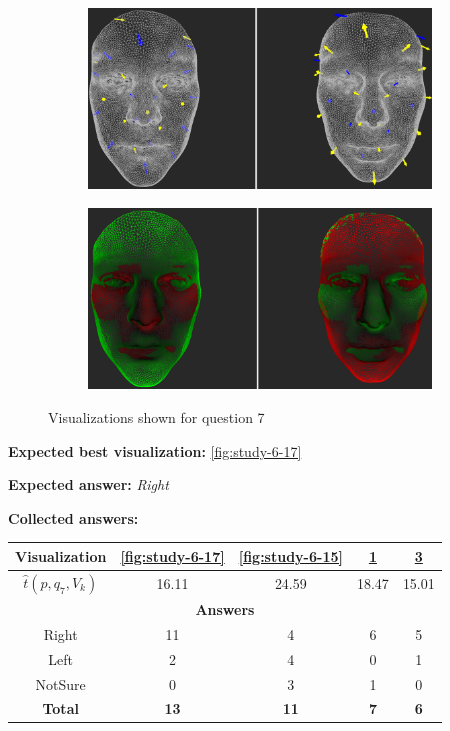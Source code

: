 \begin{figure}[h]
\begin{subfigure}{0.49\textwidth}
\includegraphics[width=\textwidth]{./img-study/pair18.PNG}
\caption{}
\label{fig:study-6-18}
\end{subfigure}
\begin{subfigure}{0.49\textwidth}
\includegraphics[width=\textwidth]{./img-study/pair16.PNG}
\caption{}
\label{fig:study-6-16}
\end{subfigure}
\caption{Visualizations shown for question 7}
\end{figure}
\medskip

{\bf Expected best visualization:} \ref{fig:study-6-17}
\medskip

{\bf Expected answer:} {\it Right}
\medskip

{\bf Collected answers:}

\begin{center}
\begin{tabular}{| c | c | c | c | c |}
	\hline
	Visualization & \ref{fig:study-6-17} & \ref{fig:study-6-15} & \ref{fig:study-6-18} & \ref{fig:study-6-16}\\ \hline
	\(\widehat{t}(p, q_7, V_k)\) & 16.11 & 24.59 & 18.47 & 15.01\\ \hline
	\multicolumn{5}{|c|}{\bf Answers} \\ \hline
	\rowcolor{yellow!30} Right & 11 & 4 & 6 & 5\\ \hline
	Left & 2 & 4 & 0 & 1\\ \hline
	NotSure & 0 & 3 & 1 & 0\\ \hline
	{\bf Total} & {\bf 13} & {\bf 11} & {\bf 7} & {\bf 6}\\ \hline
\end{tabular}
\end{center}
\clearpage

